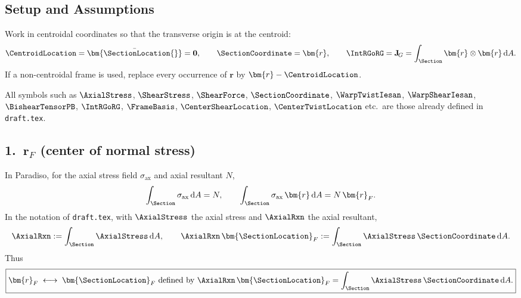 \newcommand{\WarpTwistCentroid}{\bm{r}_{wtc}}
\newcommand{\ShearForceLocation}{\bm{\rho}_{F}}
\subsection*{Setup and Assumptions}

Work in centroidal coordinates so that the transverse origin is at the centroid:
\begin{equation}
  \CentroidLocation = \bar{\bm{\SectionLocation{}}} = \mathbf{0},
  \qquad
  \SectionCoordinate = \bm{r},
  \qquad
  \IntRGoRG = \mathbf{J}_{\!G} = \int_\Section \bm{r}\otimes\bm{r}\,\mathrm{d}A.
\end{equation}
If a non-centroidal frame is used, replace every occurrence of $\bm{r}$ by $\bm{r} - \CentroidLocation$.

All symbols such as $\AxialStress$, $\ShearStress$, $\ShearForce$, $\SectionCoordinate$, $\WarpTwistIesan$, $\WarpShearIesan$, $\BishearTensorPB$, $\IntRGoRG$, $\FrameBasis$, $\CenterShearLocation$, $\CenterTwistLocation$ etc.\ are those already defined in \texttt{draft.tex}.

\subsection*{1.\ $\bm{r}_F$ (center of normal stress)}

In Paradiso, for the axial stress field $\sigma_{\mathrm{ax}}$ and axial resultant $N$,
\begin{equation}
  \int_\Section \sigma_{\mathrm{ax}}\,\mathrm{d}A = N,
  \qquad
  \int_\Section \sigma_{\mathrm{ax}}\,\bm{r}\,\mathrm{d}A = N\,\bm{r}_F.
\end{equation}
In the notation of \texttt{draft.tex}, with $\AxialStress$ the axial stress and $\AxialRxn$ the axial resultant,
\begin{equation}
  \AxialRxn := \int_\Section \AxialStress\,\mathrm{d}A,
  \qquad
  \AxialRxn\,\bm{\SectionLocation}_F := \int_\Section \AxialStress\,\SectionCoordinate\,\mathrm{d}A.
\end{equation}
Thus
\begin{equation}
  \boxed{\bm{r}_F \;\longleftrightarrow\; \bm{\SectionLocation}_F
  \text{ defined by }
  \AxialRxn\,\bm{\SectionLocation}_F = \int_\Section \AxialStress\,\SectionCoordinate\,\mathrm{d}A.}
\end{equation}

